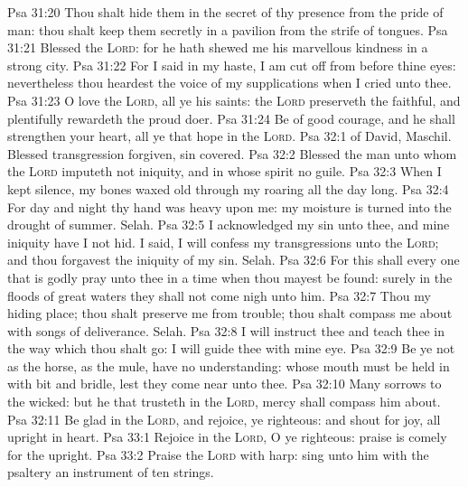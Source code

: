 \vs Psa 31:20 Thou shalt hide them in the secret of thy presence from the pride of man: thou shalt keep them secretly in a pavilion from the strife of tongues.
\vs Psa 31:21 Blessed  the \textsc{Lord}: for he hath shewed me his marvellous kindness in a strong city.
\vs Psa 31:22 For I said in my haste, I am cut off from before thine eyes: nevertheless thou heardest the voice of my supplications when I cried unto thee.
\vs Psa 31:23 O love the \textsc{Lord}, all ye his saints:  the \textsc{Lord} preserveth the faithful, and plentifully rewardeth the proud doer.
\vs Psa 31:24 Be of good courage, and he shall strengthen your heart, all ye that hope in the \textsc{Lord}.
\vs Psa 32:1  of David, Maschil. Blessed  transgression  forgiven,  sin  covered.
\vs Psa 32:2 Blessed  the man unto whom the \textsc{Lord} imputeth not iniquity, and in whose spirit  no guile.
\vs Psa 32:3 When I kept silence, my bones waxed old through my roaring all the day long.
\vs Psa 32:4 For day and night thy hand was heavy upon me: my moisture is turned into the drought of summer. Selah.
\vs Psa 32:5 I acknowledged my sin unto thee, and mine iniquity have I not hid. I said, I will confess my transgressions unto the \textsc{Lord}; and thou forgavest the iniquity of my sin. Selah.
\vs Psa 32:6 For this shall every one that is godly pray unto thee in a time when thou mayest be found: surely in the floods of great waters they shall not come nigh unto him.
\vs Psa 32:7 Thou  my hiding place; thou shalt preserve me from trouble; thou shalt compass me about with songs of deliverance. Selah.
\vs Psa 32:8 I will instruct thee and teach thee in the way which thou shalt go: I will guide thee with mine eye.
\vs Psa 32:9 Be ye not as the horse,  as the mule,  have no understanding: whose mouth must be held in with bit and bridle, lest they come near unto thee.
\vs Psa 32:10 Many sorrows  to the wicked: but he that trusteth in the \textsc{Lord}, mercy shall compass him about.
\vs Psa 32:11 Be glad in the \textsc{Lord}, and rejoice, ye righteous: and shout for joy, all  upright in heart.
\vs Psa 33:1 Rejoice in the \textsc{Lord}, O ye righteous:  praise is comely for the upright.
\vs Psa 33:2 Praise the \textsc{Lord} with harp: sing unto him with the psaltery  an instrument of ten strings.
